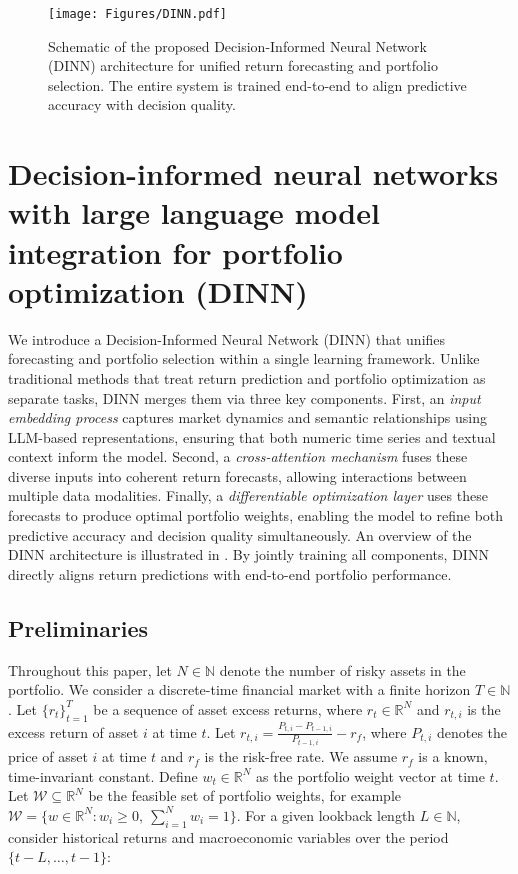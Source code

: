 \begin{figure}[h!] %
  \centering
  \texttt{[image: Figures/DINN.pdf]}%
   \captionsetup{font=footnotesize}
   \caption{Schematic of the proposed Decision-Informed Neural Network (DINN) architecture for unified return forecasting and portfolio selection. The entire system is trained end-to-end to align predictive accuracy with decision quality.}
  \label{fig:model}
\end{figure}

\section{Decision-informed neural networks with large language model integration for portfolio optimization (DINN)}
We introduce a Decision-Informed Neural Network (DINN) that unifies forecasting and portfolio selection within a single learning framework. Unlike traditional methods that treat return prediction and portfolio optimization as separate tasks, DINN merges them via three key components. First, an \emph{input embedding process} captures market dynamics and semantic relationships using LLM-based representations, ensuring that both numeric time series and textual context inform the model. Second, a \emph{cross-attention mechanism} fuses these diverse inputs into coherent return forecasts, allowing interactions between multiple data modalities. Finally, a \emph{differentiable optimization layer} uses these forecasts to produce optimal portfolio weights, enabling the model to refine both predictive accuracy and decision quality simultaneously.  An overview of the DINN architecture is illustrated in . By jointly training all components, DINN directly aligns return predictions with end-to-end portfolio performance.

\subsection{Preliminaries}
Throughout this paper, let $N \in \mathbb{N}$ denote the number of risky assets in the portfolio. We consider a discrete-time financial market with a finite horizon $ T \in \mathbb{N} $. Let $\{r_{t}\}_{t=1}^{T}$ be a sequence of asset excess returns, where $r_{t} \in \mathbb{R}^{N}$ and $r_{t,i}$ is the excess return of asset $i$ at time $t$. Let $r_{t,i} = \frac{P_{t,i} - P_{t-1,i}}{P_{t-1,i}} - r_{f}$, where $P_{t,i}$ denotes the price of asset $i$ at time $t$ and $r_{f}$ is the risk-free rate. We assume $r_f$ is a known, time-invariant constant. Define $w_{t} \in \mathbb{R}^{N}$ as the portfolio weight vector at time $t$. Let $\mathcal{W} \subseteq \mathbb{R}^{N}$ be the feasible set of portfolio weights, for example $\mathcal{W} = \{ w \in \mathbb{R}^{N}: w_i \geq 0,\ \sum_{i=1}^{N} w_i = 1 \}$. For a given lookback length $ L \in \mathbb{N} $, consider historical returns and macroeconomic variables over the period $\{t-L, \ldots, t-1\}$: 

